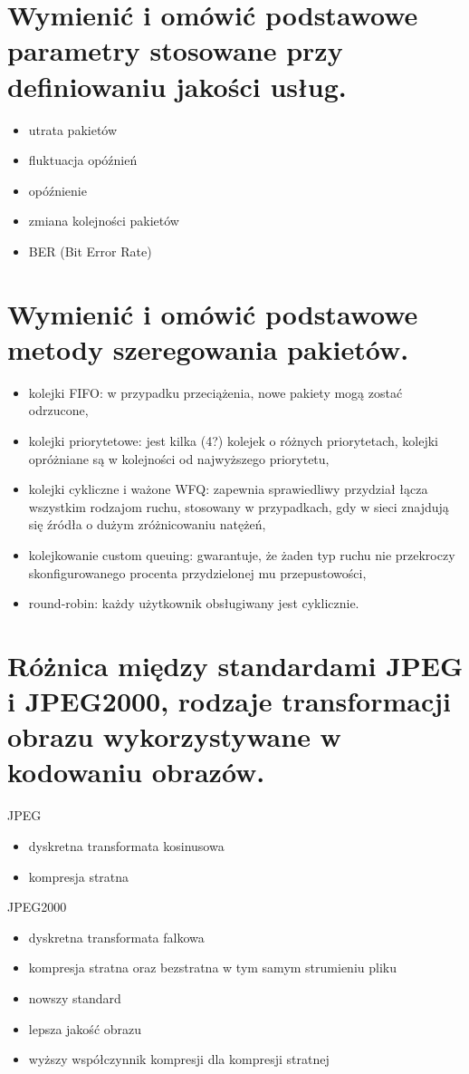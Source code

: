 \documentclass[12pt,a4paper]{article}
\begin{document}
	\section{Wymienić i omówić podstawowe parametry stosowane przy definiowaniu jakości usług.}
	\begin{itemize}
		\item utrata pakietów
		\item fluktuacja opóźnień
		\item opóźnienie
		\item zmiana kolejności pakietów
		\item BER (Bit Error Rate)
	\end{itemize}

	\section{Wymienić i omówić podstawowe metody szeregowania pakietów.}
	\begin{itemize}
		\item kolejki FIFO: w przypadku przeciążenia, nowe pakiety mogą zostać odrzucone,
		\item kolejki priorytetowe: jest kilka (4?) kolejek o różnych priorytetach, kolejki opróżniane są w kolejności od najwyższego priorytetu,
		\item kolejki cykliczne i ważone WFQ: zapewnia sprawiedliwy przydział łącza wszystkim rodzajom ruchu, stosowany w przypadkach, gdy w sieci znajdują się źródła o dużym zróżnicowaniu natężeń,
		\item kolejkowanie custom queuing: gwarantuje, że żaden typ ruchu nie przekroczy skonfigurowanego procenta przydzielonej mu przepustowości,
		\item round-robin: każdy użytkownik obsługiwany jest cyklicznie.
	\end{itemize}

	\section{Różnica między standardami JPEG i JPEG2000, rodzaje transformacji obrazu wykorzystywane w kodowaniu obrazów.}
	JPEG
	\begin{itemize}
		\item dyskretna transformata kosinusowa
		\item kompresja stratna
	\end{itemize}
	
	JPEG2000
	\begin{itemize}
		\item dyskretna transformata falkowa
		\item kompresja stratna oraz bezstratna w tym samym strumieniu pliku
		\item nowszy standard
		\item lepsza jakość obrazu
		\item wyższy współczynnik kompresji dla kompresji stratnej
	\end{itemize}
\end{document}
